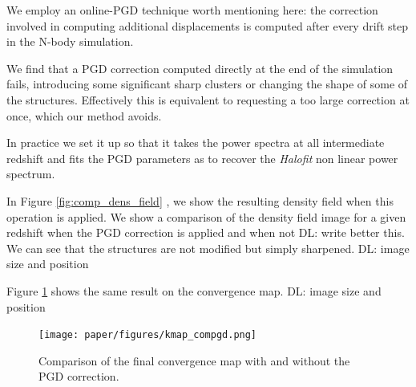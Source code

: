 \documentclass[twocolumn,twocolappendix]{aastex63}
\newcommand{\denise}[1]{{\color{red}DL: #1}}
\begin{document}
We employ an online-PGD technique worth mentioning here: the correction involved in computing additional displacements is computed after every drift step in the N-body simulation. 


We find that a PGD correction computed directly at the end of the simulation fails, introducing some significant sharp clusters or changing the shape of some of the structures. Effectively this is equivalent to requesting a too large correction at once, which our method avoids.

In practice we set it up so that it takes the power spectra at all intermediate redshift and fits the PGD parameters as to recover the \textit{Halofit} non linear power spectrum.


In Figure \ref{fig:comp_dens_field} , we show the resulting density field when this operation is applied. We show a comparison of the density field image for a given redshift when the PGD correction is applied and when not \denise{write better this}. We can see that the structures are not modified but simply sharpened.
\denise{image size and position}


Figure \ref{fig:comp_kmap} shows the same result on the convergence map.
\denise{image size and position}
\begin{figure}
    \centering
    \texttt{[image: paper/figures/kmap\_compgd.png]}
    \caption{Comparison of the final convergence map with and without the PGD correction.}
    \label{fig:comp_kmap}
\end{figure}
\end{document}
